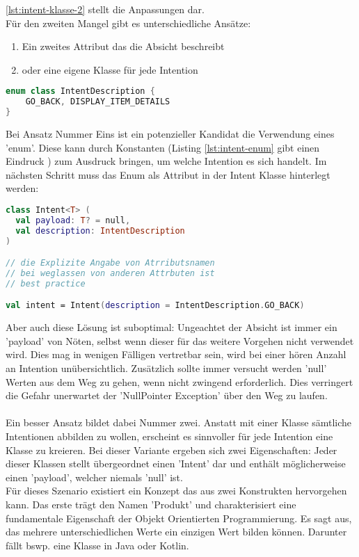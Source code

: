 \ref{lst:intent-klasse-2}
stellt die Anpassungen dar.
\\
Für den zweiten Mangel gibt es unterschiedliche Ansätze:
\begin{enumerate}
	\item Ein zweites Attribut das die Absicht beschreibt
	\item oder eine eigene Klasse für jede Intention
\end{enumerate}
\begin{lstlisting}[caption={Intent Enum}, label={lst:intent-enum}, language=Kotlin]
enum class IntentDescription {
	GO_BACK, DISPLAY_ITEM_DETAILS
}
\end{lstlisting}
\bigskip
Bei Ansatz Nummer Eins ist ein potenzieller Kandidat die Verwendung eines 'enum'. Diese kann durch Konstanten (Listing 
\ref{lst:intent-enum} gibt einen Eindruck
) zum Ausdruck bringen, um welche Intention es sich handelt. Im nächsten Schritt muss das Enum als Attribut in der Intent Klasse hinterlegt werden:
\begin{lstlisting}[caption={Intent Klasse}, label={lst:intent-klasse-2}, language=Kotlin]
class Intent<T> (
  val payload: T? = null, 
  val description: IntentDescription
)

// die Explizite Angabe von Atrributsnamen
// bei weglassen von anderen Attrbuten ist
// best practice

val intent = Intent(description = IntentDescription.GO_BACK)
\end{lstlisting}
\bigskip
Aber auch diese Lösung ist suboptimal: Ungeachtet der Absicht ist immer ein 'payload' von Nöten, selbst wenn dieser für das weitere Vorgehen nicht verwendet wird. Dies mag in wenigen Fälligen vertretbar sein, wird bei einer hören Anzahl an Intention unübersichtlich. Zusätzlich sollte immer versucht werden 'null' Werten aus dem Weg zu gehen, wenn nicht zwingend erforderlich. Dies verringert die Gefahr unerwartet der 'NullPointer Exception' über den Weg zu laufen.
\\
\\
Ein besser Ansatz bildet dabei Nummer zwei. Anstatt mit einer Klasse sämtliche Intentionen abbilden zu wollen, erscheint es sinnvoller für jede Intention eine Klasse zu kreieren. Bei dieser Variante ergeben sich zwei Eigenschaften: Jeder dieser Klassen stellt übergeordnet einen 'Intent' dar und enthält möglicherweise einen 'payload', welcher niemals 'null' ist.
\\
Für dieses Szenario existiert ein Konzept das aus zwei Konstrukten hervorgehen kann. Das erste trägt den Namen 'Produkt' und charakterisiert eine fundamentale Eigenschaft der Objekt Orientierten Programmierung. Es sagt aus, das mehrere unterschiedlichen Werte ein einzigen Wert bilden können. Darunter fällt bswp. eine Klasse in Java oder Kotlin.
